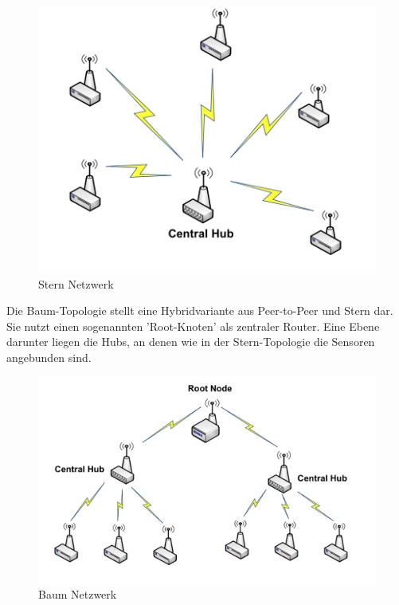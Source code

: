 \begin{figure}[H] 
	\centering
	\includegraphics[scale=0.5]{Bilder/star}
	\caption{Stern Netzwerk\cite{d:kosmerchock}}
	\label{f:star}
\end{figure}

Die Baum-Topologie stellt eine Hybridvariante aus Peer-to-Peer und Stern dar. Sie nutzt einen sogenannten 'Root-Knoten' als zentraler Router. Eine Ebene darunter liegen die Hubs, an denen wie in der Stern-Topologie die Sensoren angebunden sind. \\

\begin{figure}[H] 
	\centering
	\includegraphics[scale=0.5]{Bilder/tree}
	\caption{Baum Netzwerk\cite{d:kosmerchock}}
	\label{f:tree}
\end{figure}

